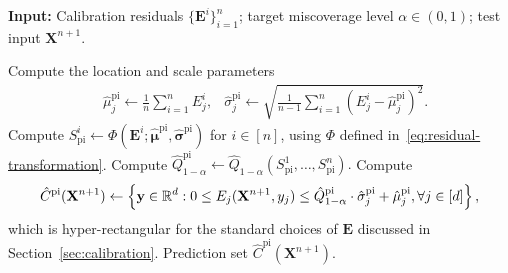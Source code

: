 \begin{algorithm}[!htb]
    \caption{Heuristic Plug-In Standardization}
    \label{alg:std-plug-in}
    \textbf{Input:} Calibration residuals $\{\mathbf{E}^i\}_{i=1}^{n}$; target miscoverage level $\alpha\in(0,1)$; test input $\mathbf{X}^{n+1}$.
    \begin{algorithmic}[1]
            \State Compute the location and scale parameters
            \begin{align*}
            & \hat{\mu}^{\mathrm{pi}}_j \gets \frac{1}{n}\sum_{i=1}^{n} E^i_j,
              & \hat{\sigma}^{\mathrm{pi}}_j \gets \sqrt{\frac{1}{n-1}\sum_{i=1}^{n}(E^i_j-\hat{\mu}^{\mathrm{pi}}_j)^2}.
            \end{align*}
            \EndFor
        \State Compute $S^i_{\mathrm{pi}} \gets \Phi(\mathbf{E}^i; \hat{\boldsymbol\mu}^{\mathrm{pi}},\hat{\boldsymbol\sigma}^{\mathrm{pi}})$ for $i \in [n]$, using $\Phi$ defined in~\eqref{eq:residual-transformation}.
        \State Compute $\hat{Q}^\mathrm{pi}_{1-\alpha}\gets \hat{Q}_{1-\alpha}(S^1_\mathrm{pi},\dots, S^n_\mathrm{pi}).$
        \State Compute 
            \begin{align*}
\hat{C}^{\mathrm{pi}}(\mathbf{X}^{n+1}) \gets \left\{\mathbf y \in \mathbb{R}^d: 0 \leq E_j(\mathbf{X}^{n+1}, y_j) \leq \hat{Q}^\mathrm{pi}_{1-\alpha}\cdot \hat{\sigma}^\mathrm{pi}_j + \hat{\mu}^\mathrm{pi}_j, \forall j \in [d]\right\},
            \end{align*}
            which is hyper-rectangular for the standard choices of $\mathbf E$ discussed in Section~\ref{sec:calibration}.
            \State \Return Prediction set $\hat{C}^{\mathrm{pi}}(\mathbf{X}^{n+1})$.
    \end{algorithmic}
\end{algorithm}

